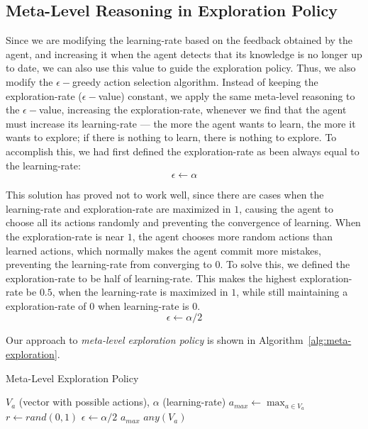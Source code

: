 \subsection{Meta-Level Reasoning in Exploration Policy}
\label{subsec:mlep}

Since we are modifying the learning-rate based on the feedback obtained by the agent, and increasing it when the agent detects that its knowledge is no longer up to date, we can also use this value to guide the exploration policy. 
Thus, we also modify the $\epsilon-$greedy action selection algorithm.
Instead of keeping the exploration-rate ($\epsilon-$value) constant, we apply the same meta-level reasoning to the $\epsilon-$value, increasing the exploration-rate, whenever we find that the agent must increase its learning-rate ---  the more the agent wants to learn, the more it wants to explore;
if there is nothing to learn, there is nothing to explore.
To accomplish this, we had first defined the exploration-rate as been always equal to the learning-rate:
\[
	\epsilon \gets \alpha
\]

This solution has proved not to work well, since there are cases when the learning-rate and exploration-rate are maximized in $1$, causing the agent to choose all its actions randomly and preventing the convergence of learning.
When the exploration-rate is near $1$, the agent chooses more random actions than learned actions, which normally makes the agent commit more mistakes, preventing the learning-rate from converging to $0$.
To solve this, we defined the exploration-rate to be half of learning-rate. This makes the highest exploration-rate be $0.5$, when the learning-rate is maximized in $1$, while still maintaining a exploration-rate of $0$ when learning-rate is $0$.
\[
	\epsilon \gets \alpha / 2
\]

Our approach to \textit{meta-level exploration policy} is shown in Algorithm~\ref{alg:meta-exploration}. 

\begin{algorithm}
	\caption{Meta-Level Exploration Policy}
	\label{alg:meta-exploration} 
	\begin{algorithmic}[1]
		\REQUIRE $V_a$ (vector with possible actions), $\alpha$ (learning-rate)
		\STATE $a_{max} \gets \max_{a \in V_a}$ \label{meta-exploration:line:max_a}
		\STATE $r \gets rand(0,1)$ \label{meta-exploration:line:rand}
		\STATE $\epsilon \gets \alpha / 2$ \label{meta-exploration:line:epsilon}
		 \label{meta-exploration:line:return-begin}
			\RETURN $a_{max}$
		\ELSE
			\RETURN $any(V_a)$
		\ENDIF \label{meta-exploration:line:return-end}
	\end{algorithmic}
\end{algorithm}


